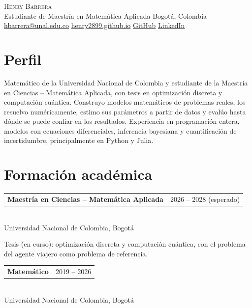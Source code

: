 \documentclass[11pt,a4paper]{article}
\makeatletter
\newcommand{\entry}[3]{%
  \begin{tabularx}{\textwidth}{@{}>{\raggedright\arraybackslash}X@{\hspace{1em}}r@{}}
    \textbf{#1} & {\color{gris}#2}
  \end{tabularx}\\
  {\color{gris}\small #3}\par\vspace{2pt}}
\makeatother
\begin{document}
\begin{center}
  {\LARGE\scshape Henry Barrera}\\[4pt]
  {\color{gris} Estudiante de Maestr\'ia en Matem\'atica Aplicada \textperiodcentered{} Bogot\'a, Colombia}\\[3pt]
  \small
  \href{mailto:hbarrera@unal.edu.co}{hbarrera@unal.edu.co}
  \textperiodcentered{} \href{https://henry2899.github.io}{henry2899.github.io}
  \textperiodcentered{} \href{https://github.com/Henry2899}{GitHub}
  \textperiodcentered{} \href{https://www.linkedin.com/in/henry-barrera-3422981aa}{LinkedIn}
\end{center}

\section{Perfil}
Matem\'atico de la Universidad Nacional de Colombia y estudiante de la Maestr\'ia en Ciencias --
Matem\'atica Aplicada, con tesis en optimizaci\'on discreta y computaci\'on cu\'antica. Construyo modelos
matem\'aticos de problemas reales, los resuelvo num\'ericamente, estimo sus par\'ametros a partir de datos
y eval\'uo hasta d\'onde se puede confiar en los resultados. Experiencia en programaci\'on entera, modelos
con ecuaciones diferenciales, inferencia bayesiana y cuantificaci\'on de incertidumbre, principalmente en
Python y Julia.

\section{Formaci\'on acad\'emica}
\entry{Maestr\'ia en Ciencias -- Matem\'atica Aplicada}{2026 -- 2028 (esperado)}{Universidad Nacional de Colombia, Bogot\'a}
Tesis (en curso): optimizaci\'on discreta y computaci\'on cu\'antica, con el problema del agente viajero
como problema de referencia.

\vspace{4pt}
\entry{Matem\'atico}{2019 -- 2026}{Universidad Nacional de Colombia, Bogot\'a}

\end{document}
